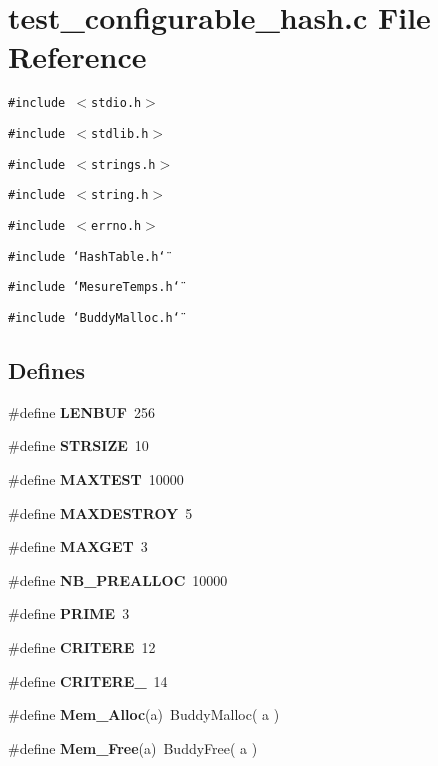 \section{test\_\-configurable\_\-hash.c File Reference}
\label{test__configurable__hash_8c}
{\tt \#include $<$stdio.h$>$}\par
{\tt \#include $<$stdlib.h$>$}\par
{\tt \#include $<$strings.h$>$}\par
{\tt \#include $<$string.h$>$}\par
{\tt \#include $<$errno.h$>$}\par
{\tt \#include \char`\"{}HashTable.h\char`\"{}}\par
{\tt \#include \char`\"{}MesureTemps.h\char`\"{}}\par
{\tt \#include \char`\"{}BuddyMalloc.h\char`\"{}}\par
\subsection*{Defines}
\begin{CompactItemize}
\item 
\#define {\bf LENBUF}~256
\item 
\#define {\bf STRSIZE}~10
\item 
\#define {\bf MAXTEST}~10000
\item 
\#define {\bf MAXDESTROY}~5
\item 
\#define {\bf MAXGET}~3
\item 
\#define {\bf NB\_\-PREALLOC}~10000
\item 
\#define {\bf PRIME}~3
\item 
\#define {\bf CRITERE}~12
\item 
\#define {\bf CRITERE\_}~14
\item 
\#define {\bf Mem\_\-Alloc}(a)~BuddyMalloc( a )
\item 
\#define {\bf Mem\_\-Free}(a)~BuddyFree( a )
\end{CompactItemize}

